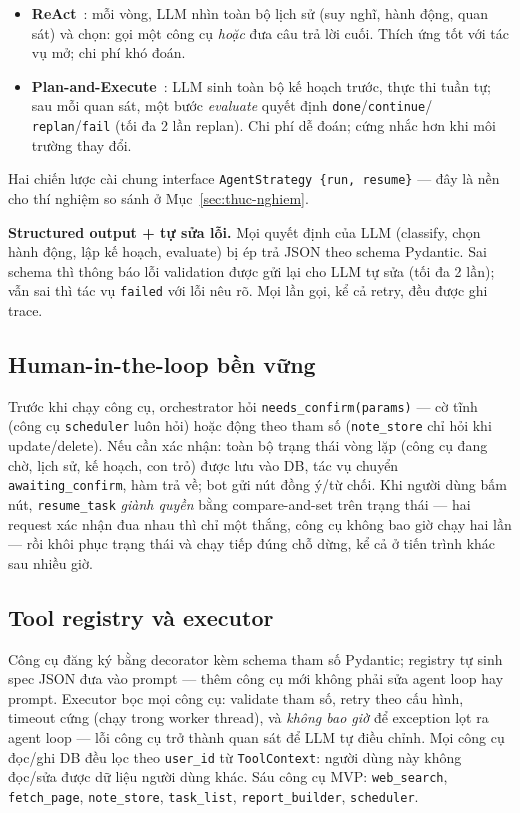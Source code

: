 \begin{itemize}
  \item \textbf{ReAct}~\cite{yao2023react}: mỗi vòng, LLM nhìn toàn bộ lịch sử
        (suy nghĩ, hành động, quan sát) và chọn: gọi một công cụ \emph{hoặc}
        đưa câu trả lời cuối. Thích ứng tốt với tác vụ mở; chi phí khó đoán.
  \item \textbf{Plan-and-Execute}~\cite{wang2023planandsolve}: LLM sinh toàn bộ
        kế hoạch trước, thực thi tuần tự; sau mỗi quan sát, một bước
        \emph{evaluate} quyết định \texttt{done}/\texttt{continue}/%
        \texttt{replan}/\texttt{fail} (tối đa 2 lần replan). Chi phí dễ đoán;
        cứng nhắc hơn khi môi trường thay đổi.
\end{itemize}

Hai chiến lược cài chung interface \texttt{AgentStrategy \{run, resume\}} ---
đây là nền cho thí nghiệm so sánh ở Mục~\ref{sec:thuc-nghiem}.

\textbf{Structured output + tự sửa lỗi.} Mọi quyết định của LLM (classify,
chọn hành động, lập kế hoạch, evaluate) bị ép trả JSON theo schema Pydantic.
Sai schema thì thông báo lỗi validation được gửi lại cho LLM tự sửa (tối đa 2
lần); vẫn sai thì tác vụ \texttt{failed} với lỗi nêu rõ. Mọi lần gọi, kể cả
retry, đều được ghi trace.

\subsection{Human-in-the-loop bền vững}

Trước khi chạy công cụ, orchestrator hỏi \texttt{needs\_confirm(params)} ---
cờ tĩnh (công cụ \texttt{scheduler} luôn hỏi) hoặc động theo tham số
(\texttt{note\_store} chỉ hỏi khi update/delete). Nếu cần xác nhận: toàn bộ
trạng thái vòng lặp (công cụ đang chờ, lịch sử, kế hoạch, con trỏ) được lưu
vào DB, tác vụ chuyển \texttt{awaiting\_confirm}, hàm trả về; bot gửi nút
đồng ý/từ chối. Khi người dùng bấm nút, \texttt{resume\_task} \emph{giành
quyền} bằng compare-and-set trên trạng thái --- hai request xác nhận đua nhau
thì chỉ một thắng, công cụ không bao giờ chạy hai lần --- rồi khôi phục trạng
thái và chạy tiếp đúng chỗ dừng, kể cả ở tiến trình khác sau nhiều giờ.

\subsection{Tool registry và executor}

Công cụ đăng ký bằng decorator kèm schema tham số Pydantic; registry tự sinh
spec JSON đưa vào prompt --- thêm công cụ mới không phải sửa agent loop hay
prompt. Executor bọc mọi công cụ: validate tham số, retry theo cấu hình,
timeout cứng (chạy trong worker thread), và \emph{không bao giờ} để exception
lọt ra agent loop --- lỗi công cụ trở thành quan sát để LLM tự điều chỉnh.
Mọi công cụ đọc/ghi DB đều lọc theo \texttt{user\_id} từ
\texttt{ToolContext}: người dùng này không đọc/sửa được dữ liệu người dùng
khác. Sáu công cụ MVP: \texttt{web\_search}, \texttt{fetch\_page},
\texttt{note\_store}, \texttt{task\_list}, \texttt{report\_builder},
\texttt{scheduler}.

